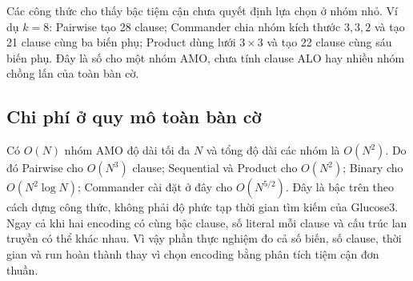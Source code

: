 Các công thức cho thấy bậc tiệm cận chưa quyết định lựa chọn ở nhóm nhỏ.
Ví dụ $k=8$: Pairwise tạo 28 clause; Commander chia nhóm kích thước
$3,3,2$ và tạo 21 clause cùng ba biến phụ; Product dùng lưới $3\times3$
và tạo 22 clause cùng sáu biến phụ. Đây là số cho một nhóm AMO, chưa
tính clause ALO hay nhiều nhóm chồng lấn của toàn bàn cờ.

\subsection{Chi phí ở quy mô toàn bàn cờ}

Có $O(N)$ nhóm AMO độ dài tối đa $N$ và tổng độ dài các nhóm là
$O(N^2)$. Do đó Pairwise cho $O(N^3)$ clause; Sequential và Product
cho $O(N^2)$; Binary cho $O(N^2\log N)$; Commander cài đặt ở đây
cho $O(N^{5/2})$. Đây là bậc trên theo cách dựng công thức, không phải
độ phức tạp thời gian tìm kiếm của Glucose3. Ngay cả khi hai encoding
có cùng bậc clause, số literal mỗi clause và cấu trúc lan truyền có thể
khác nhau. Vì vậy phần thực nghiệm đo cả số biến, số clause, thời gian
và run hoàn thành thay vì chọn encoding bằng phân tích tiệm cận đơn thuần.

